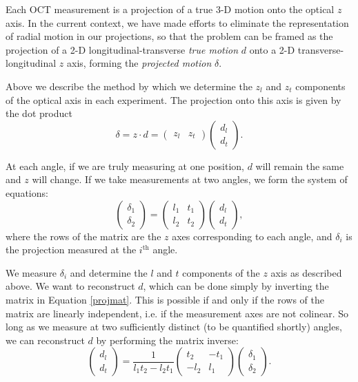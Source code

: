 \documentclass{article}
\begin{document}
\par{Each OCT measurement is a projection of a true 3-D motion onto the optical $z$ axis. In the current context, we have made efforts to eliminate the representation of radial motion in our projections, so that the problem can be framed as the projection of a 2-D longitudinal-transverse \textit{true motion} $d$ onto a 2-D transverse-longitudinal $z$ axis, forming the \textit{projected motion} $\delta$.}
\par{Above we describe the method by which we determine the $z_l$ and $z_t$ components of the optical axis in each experiment. The projection onto this axis is given by the dot product
	\begin{equation}
		\delta = z \cdot d = \begin{pmatrix}z_l& z_t\end{pmatrix}\begin{pmatrix}d_l\\d_t\end{pmatrix}.
	\end{equation}
}
\par{At each angle, if we are truly measuring at one position, $d$ will remain the same and $z$ will change. If we take measurements at two angles, we form the system of equations:
	\begin{equation}\label{projmat}
		\begin{pmatrix}\delta_1 \\ \delta_2\end{pmatrix} = \begin{pmatrix}l_1 & t_1\\l_2 & t_2\end{pmatrix}\begin{pmatrix}d_l\\d_t\end{pmatrix},
	\end{equation}
	where the rows of the matrix are the $z$ axes corresponding to each angle, and $\delta_i$ is the projection measured at the $i^\text{th}$ angle.
}
\par{We measure $\delta_i$ and determine the $l$ and $t$ components of the $z$ axis as described above. We want to reconstruct $d$, which can be done simply by inverting the matrix in Equation \ref{projmat}. This is possible if and only if the rows of the matrix are linearly independent, i.e. if the measurement axes are not colinear. So long as we measure at two sufficiently distinct (to be quantified shortly) angles, we can reconstruct $d$ by performing the matrix inverse:
	\begin{equation}\label{fullreconstruct}
		\begin{pmatrix}d_l\\d_t\end{pmatrix}=\frac{1}{l_1 t_2 - l_2 t_1}\begin{pmatrix}t_2&-t_1\\-l_2 & l_1\end{pmatrix}\begin{pmatrix}\delta_1\\ \delta_2\end{pmatrix}.
	\end{equation}
}
\end{document}
